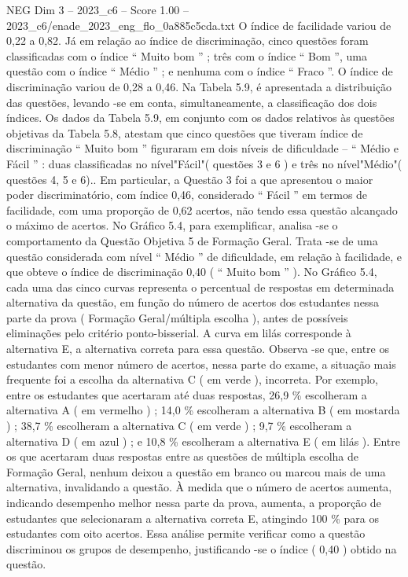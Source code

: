 \begin{textsample}{NEG Dim 3 – 2023\_c6 – Score 1.00 – 2023\_c6/enade\_2023\_eng\_flo\_0a885c5cda.txt}
O índice de facilidade variou de 0,22 a 0,82.
Já em relação ao índice de discriminação, cinco questões foram classificadas com o índice “ Muito bom ” ; três com o índice “ Bom ”, uma questão com o índice “ Médio ” ; e nenhuma com o índice “ Fraco ”.
O índice de discriminação variou de 0,28 a 0,46.
Na Tabela 5.9, é apresentada a distribuição das questões, levando -se em conta, simultaneamente, a classificação dos dois índices.
Os dados da Tabela 5.9, em conjunto com os dados relativos às questões objetivas da Tabela 5.8, atestam que cinco questões que tiveram índice de discriminação “ Muito bom ” figuraram em dois níveis de dificuldade – “ Médio e Fácil ” : duas classificadas no nível"Fácil"( questões 3 e 6 ) e três no nível"Médio"( questões 4, 5 e 6)..
Em particular, a Questão 3 foi a que apresentou o maior poder discriminatório, com índice 0,46, considerado “ Fácil ” em termos de facilidade, com uma proporção de 0,62 acertos, não tendo essa questão alcançado o máximo de acertos.
No Gráfico 5.4, para exemplificar, analisa -se o comportamento da Questão Objetiva 5 de Formação Geral.
Trata -se de uma questão considerada com nível “ Médio ” de dificuldade, em relação à facilidade, e que obteve o índice de discriminação 0,40 ( “ Muito bom ” ).
No Gráfico 5.4, cada uma das cinco curvas representa o percentual de respostas em determinada alternativa da questão, em função do número de acertos dos estudantes nessa parte da prova ( Formação Geral/múltipla escolha ), antes de possíveis eliminações pelo critério ponto-bisserial.
A curva em lilás corresponde à alternativa E, a alternativa correta para essa questão.
Observa -se que, entre os estudantes com menor número de acertos, nessa parte do exame, a situação mais frequente foi a escolha da alternativa C ( em verde ), incorreta.
Por exemplo, entre os estudantes que acertaram até duas respostas, 26,9 \% escolheram a alternativa A ( em vermelho ) ; 14,0 \% escolheram a alternativa B ( em mostarda ) ; 38,7 \% escolheram a alternativa C ( em verde ) ; 9,7 \% escolheram a alternativa D ( em azul ) ; e 10,8 \% escolheram a alternativa E ( em lilás ).
Entre os que acertaram duas respostas entre as questões de múltipla escolha de Formação Geral, nenhum deixou a questão em branco ou marcou mais de uma alternativa, invalidando a questão.
À medida que o número de acertos aumenta, indicando desempenho melhor nessa parte da prova, aumenta, a proporção de estudantes que selecionaram a alternativa correta E, atingindo 100 \% para os estudantes com oito acertos.
Essa análise permite verificar como a questão discriminou os grupos de desempenho, justificando -se o índice ( 0,40 ) obtido na questão.

\end{textsample}
